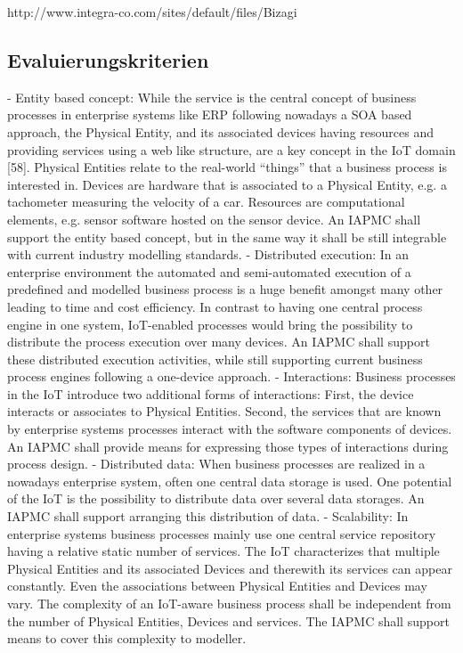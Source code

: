 \documentclass[a4paper, 12pt, twoside, headsepline=true]{scrartcl} %
\begin{document}
http://www.integra-co.com/sites/default/files/Bizagi%

\subsection{Evaluierungskriterien}

- Entity based concept: While the service is the central concept of business processes in enterprise systems like ERP following nowadays a SOA based approach, the Physical Entity, and its associated devices having resources and providing services using a web like structure, are a key concept in the IoT domain [58]. Physical Entities relate to the real-world “things” that a business process is interested in. Devices are hardware that is associated to a Physical Entity, e.g. a tachometer measuring the velocity of a car. Resources are computational elements, e.g. sensor software hosted on the sensor device. An IAPMC shall support the entity based concept, but in the same way it shall be still integrable with current industry modelling standards.
- Distributed execution: In an enterprise environment the automated and semi-automated execution of a predefined and modelled business process is a huge benefit amongst many other leading to time and cost efficiency. In contrast to having one central process engine in one system, IoT-enabled processes would bring the possibility to distribute the process execution over many devices. An IAPMC shall support these distributed execution activities, while still supporting current business process engines following a one-device approach.
- Interactions: Business processes in the IoT introduce two additional forms of interactions: First, the device interacts or associates to Physical Entities. Second, the services that are known by enterprise systems processes interact with the software components of devices. An IAPMC shall provide means for expressing those types of interactions during process design.
- Distributed data: When business processes are realized in a nowadays enterprise system, often one central data storage is used. One potential of the IoT is the possibility to distribute data over several data storages. An IAPMC shall support arranging this distribution of data.
- Scalability: In enterprise systems business processes mainly use one central service repository having a relative static number of services. The IoT characterizes that multiple Physical Entities and its associated Devices and therewith its services can appear constantly. Even the associations between Physical Entities and Devices may vary. The complexity of an IoT-aware business process shall be independent from the number of Physical Entities, Devices and services. The IAPMC shall support means to cover this complexity to modeller.
\end{document}
